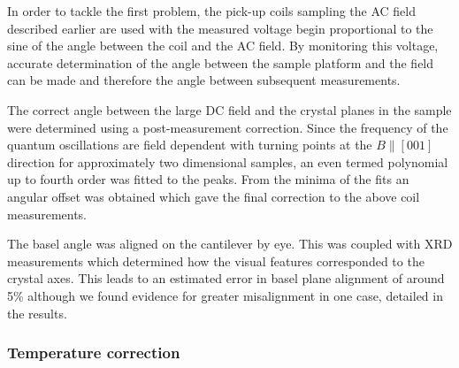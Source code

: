In order to tackle the first problem, the pick-up coils sampling the AC field described earlier are used with the measured voltage begin proportional to the sine of the angle between the coil and the AC field. By monitoring this voltage, accurate determination of the angle between the sample platform and the field can be made and therefore the angle between subsequent measurements.

The correct angle between the large DC field and the crystal planes in the sample were determined using a post-measurement correction. Since the frequency of the quantum oscillations are field dependent with turning points at the $B\parallel [001]$ direction for approximately two dimensional samples, an even termed polynomial up to fourth order was fitted to the peaks. From the minima of the fits an angular offset was obtained which gave the final correction to the above coil measurements.

The basel angle was aligned on the cantilever by eye. This was coupled with \ac{XRD} measurements which determined how the visual features corresponded to the crystal axes. This leads to an estimated error in basel plane alignment of around \unit{5}{\%} although we found evidence for greater misalignment in one case, detailed in the results.

\subsubsection{Temperature correction}
    \label{Sec:Exp:TemepratureCorrection}

